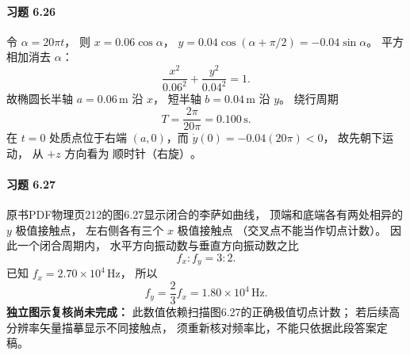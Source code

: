 \paragraph{习题 6.26}
令 \(\alpha=20\pi t\)，
则
\(x=0.06\cos\alpha\)，
\(y=0.04\cos(\alpha+\pi/2)
 =-0.04\sin\alpha\)。
平方相加消去 \(\alpha\)：
\[
 \boxed{\frac{x^2}{0.06^2}
 +\frac{y^2}{0.04^2}=1}.
\]
故椭圆长半轴
\(a=0.06\,\mathrm m\) 沿 \(x\)，
短半轴 \(b=0.04\,\mathrm m\) 沿 \(y\)。
绕行周期
\[
 \boxed{T=\frac{2\pi}{20\pi}=0.100\,\mathrm s}.
\]
在 \(t=0\) 处质点位于右端
\((a,0)\)，而
\(\dot y(0)=-0.04(20\pi)<0\)，
故先朝下运动，
从 \(+z\) 方向看为
\(\boxed{\text{顺时针（右旋）}}\)。

\paragraph{习题 6.27}
原书PDF物理页212的图6.27显示闭合的李萨如曲线，
顶端和底端各有两处相异的 \(y\) 极值接触点，
左右侧各有三个 \(x\) 极值接触点
（交叉点不能当作切点计数）。
因此一个闭合周期内，
水平方向振动数与垂直方向振动数之比
\[
 \boxed{f_x:f_y=3:2}.
\]
已知 \(f_x=2.70\times10^4\,\mathrm{Hz}\)，
所以
\[
 \boxed{f_y=\frac23 f_x
 =1.80\times10^4\,\mathrm{Hz}}.
\]
\textbf{独立图示复核尚未完成：}
此数值依赖扫描图6.27的正确极值切点计数；
若后续高分辨率矢量描摹显示不同接触点，
须重新核对频率比，不能只依据此段答案定稿。
